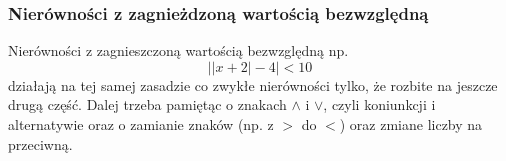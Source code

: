 \documentclass[12pt, a4paper]{article}
\begin{document}
\subsubsection{Nierówności z zagnieżdzoną wartością bezwzględną}
Nierówności z zagnieszczoną wartością bezwzględną np. $$\left|\left|x+2\right|-4\right|<10$$ działają na tej samej zasadzie co
zwykłe nierówności tylko, że rozbite na jeszcze drugą część. Dalej trzeba pamiętąc o znakach $\wedge$ i $\vee$, czyli koniunkcji i alternatywie
oraz o zamianie znaków (np. z $>$ do $<$) oraz zmiane liczby na przeciwną.

\end{document}
